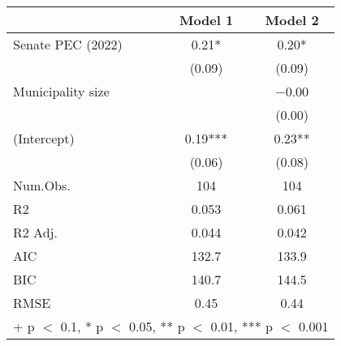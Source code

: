 \begin{table}
\centering
\begin{tabular}[t]{lcc}
\toprule
  & Model 1 & Model 2\\
\midrule
Senate PEC (2022) & \num{0.21}* & \num{0.20}*\\
 & (\num{0.09}) & (\num{0.09})\\
Municipality size &  & \num{-0.00}\\
 &  & (\num{0.00})\\
(Intercept) & \num{0.19}*** & \num{0.23}**\\
 & (\num{0.06}) & (\num{0.08})\\
\midrule
Num.Obs. & \num{104} & \num{104}\\
R2 & \num{0.053} & \num{0.061}\\
R2 Adj. & \num{0.044} & \num{0.042}\\
AIC & \num{132.7} & \num{133.9}\\
BIC & \num{140.7} & \num{144.5}\\
RMSE & \num{0.45} & \num{0.44}\\
\bottomrule
\multicolumn{3}{l}{\rule{0pt}{1em}+ p $<$ 0.1, * p $<$ 0.05, ** p $<$ 0.01, *** p $<$ 0.001}\\
\end{tabular}
\end{table}
